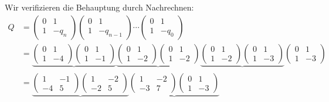 \begin{beispiel}
Wir verifizieren die Behauptung durch Nachrechnen:
\begin{align*}
Q
&=
\begin{pmatrix} 0&1 \\ 1&-q_n\end{pmatrix}
\begin{pmatrix} 0&1 \\ 1&-q_{n-1}\end{pmatrix}
\cdots
\begin{pmatrix} 0&1 \\ 1&-q_{0}\end{pmatrix}
\\
&=
\underbrace{
\begin{pmatrix} 0&1 \\ 1& -4 \end{pmatrix}
\begin{pmatrix} 0&1 \\ 1& -1 \end{pmatrix}
}_{}
\underbrace{
\begin{pmatrix} 0&1 \\ 1& -2 \end{pmatrix}
\begin{pmatrix} 0&1 \\ 1& -2 \end{pmatrix}
}_{}
\underbrace{
\begin{pmatrix} 0&1 \\ 1& -2 \end{pmatrix}
\begin{pmatrix} 0&1 \\ 1& -3 \end{pmatrix}
}_{}
\begin{pmatrix} 0&1 \\ 1& -3 \end{pmatrix}
\\
&=
\underbrace{
\begin{pmatrix} 1 & -1 \\ -4 &  5 \end{pmatrix}
\begin{pmatrix} 1 & -2 \\ -2 &  5 \end{pmatrix}
}_{}
\underbrace{
\begin{pmatrix} 1 & -2 \\ -3 &  7 \end{pmatrix}
\begin{pmatrix} 0 &  1 \\  1 & -3 \end{pmatrix}
}
\end{align*}
\end{beispiel}
